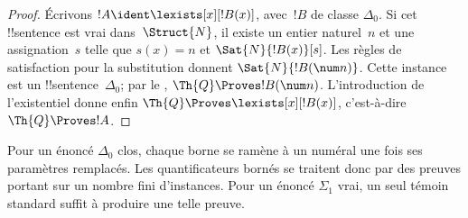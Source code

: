 \documentclass[../../../include/open-logic-section]{subfiles}
\begin{document}
\begin{proof}
Écrivons $!A\ident\lexists[x][!B(x)]$, avec~$!B$
de classe $\Delta_0$. Si cet !!{sentence} est vrai
dans~$\Struct{N}$, il existe un entier naturel~$n$
et une assignation~$s$ telle que $s(x)=n$ et
$\Sat{N}{!B(x)}[s]$. Les règles de satisfaction
pour la substitution donnent
$\Sat{N}{!B(\num n)}$.
Cette instance est un !!{sentence}~$\Delta_0$;
par le ,
$\Th{Q}\Proves !B(\num n)$. L'introduction
de l'existentiel donne enfin
$\Th{Q}\Proves\lexists[x][!B(x)]$, c'est-à-dire
$\Th{Q}\Proves !A$.
\end{proof}

\begin{explain}
Pour un énoncé $\Delta_0$ clos, chaque borne se ramène à un
numéral une fois ses paramètres remplacés. Les quantificateurs
bornés se traitent donc par des preuves portant sur un nombre
fini d'instances. Pour un énoncé $\Sigma_1$ vrai, un seul témoin
standard suffit à produire une telle preuve.
\end{explain}
\end{document}
